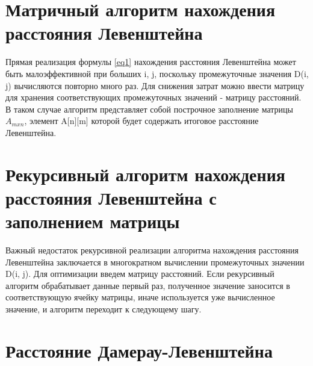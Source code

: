 \documentclass[a4paper,oneside,14pt]{extreport}
\begin{document}
\section{Матричный алгоритм нахождения расстояния Левенштейна}

Прямая реализация формулы \ref{eq1} нахождения расстояния Левенштейна может быть малоэффективной при больших i, j, поскольку  промежуточные значения D(i, j) вычисляются повторно много раз. Для снижения затрат можно ввести матрицу для хранения соответствующих промежуточных значений - матрицу расстояний. В таком случае алгоритм представляет собой построчное заполнение матрицы $A_{m x n}$, элемент A[n][m] которой будет содержать итоговое расстояние Левенштейна.


\section{Рекурсивный алгоритм нахождения расстояния Левенштейна с заполнением матрицы}

Важный недостаток рекурсивной реализации алгоритма нахождения расстояния Левенштейна заключается в многократном вычислении  промежуточных значении D(i, j). Для оптимизации введем матрицу расстояний. Если рекурсивный алгоритм обрабатывает данные первый раз, полученное значение заносится в соответствующую ячейку матрицы, иначе используется уже вычисленное значение, и алгоритм переходит к следующему шагу.

\section{Расстояние Дамерау-Левенштейна}
\end{document}

